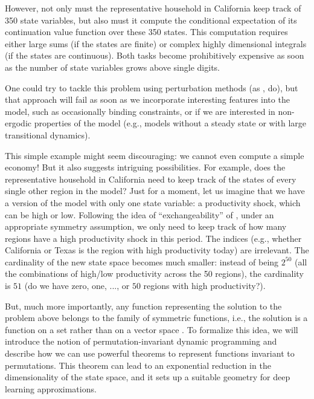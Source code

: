\documentclass[12pt]{article}
\begin{document}
However, not only must the representative household in California keep track of 350 state variables, but also must it compute the conditional expectation of its continuation value function over these 350 states. This computation requires either large sums (if the states are finite) or complex highly dimensional integrals (if the states are continuous). Both tasks become prohibitively expensive as soon as the number of state variables grows above single digits.

One could try to tackle this problem using perturbation methods (as \citealp{Backus1992}, do), but that approach will fail as soon as we incorporate interesting features into the model, such as occasionally binding constraints, or if we are interested in non-ergodic properties of the model (e.g., models without a steady state or with large transitional dynamics).

This simple example might seem discouraging: we cannot even compute a simple economy! But it also suggests intriguing possibilities. For example, does the representative household in California need to keep track of the states of every single other region in the model? Just for a moment, let us imagine that we have a version of the model with only one state variable: a productivity shock, which can be high or low. Following the idea of ``exchangeability'' of \citet{Pakes2001}, under an appropriate symmetry assumption, we only need to keep track of how many regions have a high productivity shock in this period. The indices (e.g., whether California or Texas is the region with high productivity today) are irrelevant. The cardinality of the new state space becomes much smaller: instead of being $2^{50}$ (all the combinations of high/low productivity across the 50 regions), the cardinality is $51$ (do we have zero, one, ..., or $50$ regions with high productivity?). 

But, much more importantly, any function representing the solution to the problem above belongs to the family of symmetric functions, i.e., the solution is a function on a set rather than on a vector space \citep{macdonald1998symmetric}. To formalize this idea, we will introduce the notion of permutation-invariant dynamic programming and describe how we can use powerful theorems to represent functions invariant to permutations. This theorem can lead to an exponential reduction in the dimensionality of the state space, and it sets up a suitable geometry for deep learning approximations. 
\end{document}
